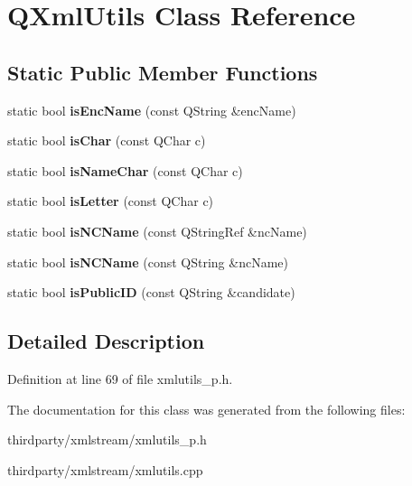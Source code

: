 \hypertarget{class_q_xml_utils}{}\section{Q\+Xml\+Utils Class Reference}
\label{class_q_xml_utils}
\subsection*{Static Public Member Functions}
\begin{DoxyCompactItemize}
\item 
\mbox{\label{class_q_xml_utils_aa216476b6d10fce4af23136661409a19}} 
static bool {\bfseries is\+Enc\+Name} (const Q\+String \&enc\+Name)
\item 
\mbox{\label{class_q_xml_utils_a6c8405a364492eb2e6a7c2fb13fe8512}} 
static bool {\bfseries is\+Char} (const Q\+Char c)
\item 
\mbox{\label{class_q_xml_utils_af3dcc74b96d75c043101b9fecbdc7f4c}} 
static bool {\bfseries is\+Name\+Char} (const Q\+Char c)
\item 
\mbox{\label{class_q_xml_utils_ad51eb13489a4a65ddbaace2f2ba5035c}} 
static bool {\bfseries is\+Letter} (const Q\+Char c)
\item 
\mbox{\label{class_q_xml_utils_a36721d0d8d86e275ce20d8823a6543cb}} 
static bool {\bfseries is\+N\+C\+Name} (const Q\+String\+Ref \&nc\+Name)
\item 
\mbox{\label{class_q_xml_utils_a9853a0a61bae162ed23a6b1d89ae0661}} 
static bool {\bfseries is\+N\+C\+Name} (const Q\+String \&nc\+Name)
\item 
\mbox{\label{class_q_xml_utils_a1447d5b88004f46af331a594343caf35}} 
static bool {\bfseries is\+Public\+ID} (const Q\+String \&candidate)
\end{DoxyCompactItemize}


\subsection{Detailed Description}


Definition at line 69 of file xmlutils\+\_\+p.\+h.



The documentation for this class was generated from the following files\+:\begin{DoxyCompactItemize}
\item 
thirdparty/xmlstream/xmlutils\+\_\+p.\+h\item 
thirdparty/xmlstream/xmlutils.\+cpp\end{DoxyCompactItemize}

